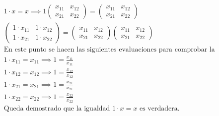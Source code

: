 \begin{exercise}[ Sea $x=\begin{pmatrix}
				x_{11}&x_{12}\\x_{21}&x_{22}\end{pmatrix}$, $x\in M_{2\times 2}(\R)$]

	\begin{align*}
		 & 1\cdot x=x\implies 1\begin{pmatrix}
			                       x_{11} & x_{12} \\x_{21}&x_{22}
		                       \end{pmatrix}=\begin{pmatrix}
			                                     x_{11} & x_{12} \\x_{21}&x_{22}
		                                     \end{pmatrix}                      \\
		 & \begin{pmatrix}
			   1\cdot x_{11} & 1\cdot x_{12} \\1\cdot x_{21}&1\cdot x_{22}
		   \end{pmatrix}=\begin{pmatrix}
			                 x_{11} & x_{12} \\x_{21}&x_{22}
		                 \end{pmatrix}\begin{pmatrix}
			                              x_{11} & x_{12} \\x_{21}&x_{22}
		                              \end{pmatrix}                            \\
		 & \text{En este punto se hacen las siguientes evaluaciones para comprobar la igualdad.} \\
		 & 1\cdot x_{11}=x_{11}\implies 1=\frac{x_{11}}{x_{11}}                                  \\
		 & 1\cdot x_{12}=x_{12} \implies 1=\frac{x_{12}}{x_{12}}                                 \\
		 & 1\cdot x_{21}=x_{21}\implies 1=\frac{x_{21}}{x_{21}}                                  \\
		 & 1\cdot x_{22}=x_{22}\implies 1=\frac{x_{22}}{x_{22}}                                  \\
		 & \text{Queda demostrado que la igualdad $1\cdot x=x$ es verdadera.}
	\end{align*}
\end{exercise}

